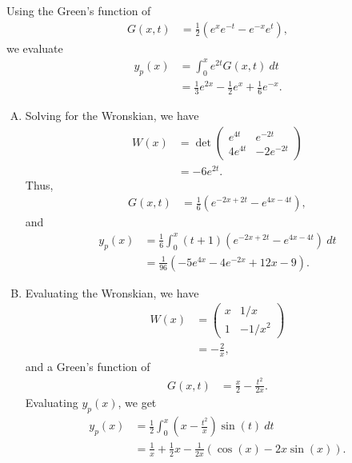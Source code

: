 \documentclass[10pt]{mypackage}
\begin{document}
\begin{solution}[4.6, Problem 34]
  Using the Green's function of
  \begin{align*}
    G\left( x,t \right) &= \frac{1}{2}\left( e^{x}e^{-t} - e^{-x}e^{t} \right),
  \end{align*}
  we evaluate
  \begin{align*}
    y_p(x) &= \int_{0}^{x} e^{2t}G\left( x,t \right)\:dt\\
           &= \frac{1}{3}e^{2x} -\frac{1}{2}e^{x} + \frac{1}{6}e^{-x}.
  \end{align*}
\end{solution}
\begin{solution}\hfill
  \begin{enumerate}[(A)]
    \item Solving for the Wronskian, we have
      \begin{align*}
        W(x) &= \det \begin{pmatrix}e^{4t} & e^{-2t} \\ 4e^{4t} & -2e^{-2t}\end{pmatrix}\\
             &= -6e^{2t}.
      \end{align*}
      Thus,
      \begin{align*}
        G\left( x,t \right) &= \frac{1}{6}\left( e^{-2x+2t} - e^{4x-4t} \right),
      \end{align*}
      and
      \begin{align*}
        y_p(x) &= \frac{1}{6}\int_{0}^{x} \left( t+1 \right)\left( e^{-2x+2t} - e^{4x-4t} \right)\:dt\\
               &= \frac{1}{96}\left( -5e^{4x} - 4e^{-2x} + 12x - 9 \right).
      \end{align*}
    \item Evaluating the Wronskian, we have
      \begin{align*}
        W(x) &= \begin{pmatrix}x & 1/x \\ 1 & -1/x^2\end{pmatrix}\\
             &= -\frac{2}{x},
      \end{align*}
      and a Green's function of
      \begin{align*}
        G(x,t) &= \frac{x}{2}- \frac{t^2}{2x}.
      \end{align*}
      Evaluating $y_p(x)$, we get
      \begin{align*}
        y_p(x) &= \frac{1}{2} \int_{0}^{x} \left( x-\frac{t^2}{x} \right)\sin(t)\:dt\\
               &= \frac{1}{x} + \frac{1}{2}x - \frac{1}{2x}\left( \cos(x) - 2x\sin(x) \right).
      \end{align*}
  \end{enumerate}
\end{solution}
\end{document}
